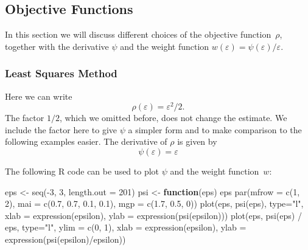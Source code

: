 \documentclass[
  a4paper,
]{article}
\newenvironment{Shaded}{\begin{snugshade}}{\end{snugshade}}
\newcommand{\AttributeTok}[1]{\textcolor[rgb]{0.77,0.63,0.00}{#1}}
\newcommand{\ControlFlowTok}[1]{\textcolor[rgb]{0.13,0.29,0.53}{\textbf{#1}}}
\newcommand{\DecValTok}[1]{\textcolor[rgb]{0.00,0.00,0.81}{#1}}
\newcommand{\FloatTok}[1]{\textcolor[rgb]{0.00,0.00,0.81}{#1}}
\newcommand{\FunctionTok}[1]{\textcolor[rgb]{0.00,0.00,0.00}{#1}}
\newcommand{\NormalTok}[1]{#1}
\newcommand{\OtherTok}[1]{\textcolor[rgb]{0.56,0.35,0.01}{#1}}
\newcommand{\SpecialCharTok}[1]{\textcolor[rgb]{0.00,0.00,0.00}{#1}}
\newcommand{\StringTok}[1]{\textcolor[rgb]{0.31,0.60,0.02}{#1}}
\theoremstyle{definition}
\theoremstyle{definition}
\theoremstyle{definition}
\theoremstyle{definition}
\theoremstyle{remark}
\begin{document}
\hypertarget{objective-functions}{%
\subsection{Objective Functions}\label{objective-functions}}

In this section we will discuss different choices of the objective
function~\(\rho\), together with the derivative \(\psi\) and
the weight function \(w(\varepsilon) = \psi(\varepsilon) / \varepsilon\).

\hypertarget{least-squares-method}{%
\subsubsection{Least Squares Method}\label{least-squares-method}}

Here we can write
\begin{equation*}
  \rho(\varepsilon)
  = \varepsilon^2 / 2.
\end{equation*}
The factor \(1/2\), which we omitted before, does not change the estimate. We
include the factor here to give \(\psi\) a simpler form and to make comparison
to the following examples easier. The derivative of \(\rho\) is given by
\begin{equation*}
  \psi(\varepsilon)
  = \varepsilon
\end{equation*}

The following R code can be used to plot \(\psi\) and the weight
function~\(w\):

\begin{Shaded}
\begin{Highlighting}[]
\NormalTok{eps }\OtherTok{\textless{}{-}} \FunctionTok{seq}\NormalTok{(}\SpecialCharTok{{-}}\DecValTok{3}\NormalTok{, }\DecValTok{3}\NormalTok{, }\AttributeTok{length.out =} \DecValTok{201}\NormalTok{)}
\NormalTok{psi }\OtherTok{\textless{}{-}} \ControlFlowTok{function}\NormalTok{(eps) eps}
\FunctionTok{par}\NormalTok{(}\AttributeTok{mfrow =} \FunctionTok{c}\NormalTok{(}\DecValTok{1}\NormalTok{, }\DecValTok{2}\NormalTok{),}
    \AttributeTok{mai =} \FunctionTok{c}\NormalTok{(}\FloatTok{0.7}\NormalTok{, }\FloatTok{0.7}\NormalTok{, }\FloatTok{0.1}\NormalTok{, }\FloatTok{0.1}\NormalTok{),}
    \AttributeTok{mgp =} \FunctionTok{c}\NormalTok{(}\FloatTok{1.7}\NormalTok{, }\FloatTok{0.5}\NormalTok{, }\DecValTok{0}\NormalTok{))}
\FunctionTok{plot}\NormalTok{(eps, }\FunctionTok{psi}\NormalTok{(eps), }\AttributeTok{type=}\StringTok{"l"}\NormalTok{,}
     \AttributeTok{xlab =} \FunctionTok{expression}\NormalTok{(epsilon), }\AttributeTok{ylab =} \FunctionTok{expression}\NormalTok{(}\FunctionTok{psi}\NormalTok{(epsilon)))}
\FunctionTok{plot}\NormalTok{(eps, }\FunctionTok{psi}\NormalTok{(eps) }\SpecialCharTok{/}\NormalTok{ eps, }\AttributeTok{type=}\StringTok{"l"}\NormalTok{, }\AttributeTok{ylim =} \FunctionTok{c}\NormalTok{(}\DecValTok{0}\NormalTok{, }\DecValTok{1}\NormalTok{),}
     \AttributeTok{xlab =} \FunctionTok{expression}\NormalTok{(epsilon),}
     \AttributeTok{ylab =} \FunctionTok{expression}\NormalTok{(}\FunctionTok{psi}\NormalTok{(epsilon)}\SpecialCharTok{/}\NormalTok{epsilon))}
\end{Highlighting}
\end{Shaded}
\end{document}

